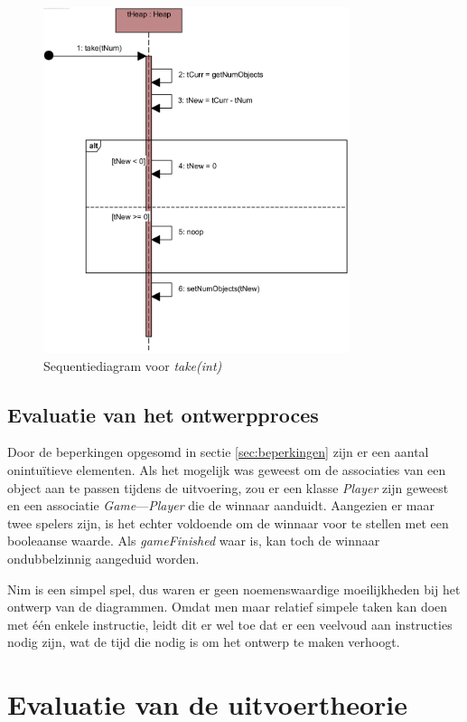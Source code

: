 \begin{figure}[htp]
	\includegraphics[width=0.8\textwidth]{chap-evaluatie/take.png}
	\caption{Sequentiediagram voor \textit{take(int)}}
	\label{fig:nim-take}
\end{figure}

\subsection{Evaluatie van het ontwerpproces}

Door de beperkingen opgesomd in sectie \ref{sec:beperkingen} zijn er een aantal onintu\"itieve elementen. Als het mogelijk was geweest om de associaties van een object aan te passen tijdens de uitvoering, zou er een klasse \textit{Player} zijn geweest en een associatie \textit{Game}---\textit{Player} die de winnaar aanduidt. Aangezien er maar twee spelers zijn, is het echter voldoende om de winnaar voor te stellen met een booleaanse waarde. Als \textit{gameFinished} waar is, kan toch de winnaar ondubbelzinnig aangeduid worden.

Nim is een simpel spel, dus waren er geen noemenswaardige moeilijkheden bij het ontwerp van de diagrammen. Omdat men maar relatief simpele taken kan doen met \'e\'en enkele instructie, leidt dit er wel toe dat er een veelvoud aan instructies nodig zijn, wat de tijd die nodig is om het ontwerp te maken verhoogt.

\section{Evaluatie van de uitvoertheorie}

